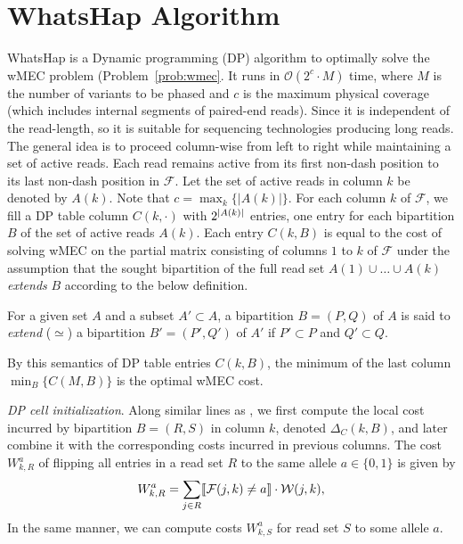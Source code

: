 \section{WhatsHap Algorithm}\label{sec:algorithm}
WhatsHap \citep{Patterson2015} is a Dynamic programming (DP) algorithm to optimally solve the wMEC problem (Problem~\ref{prob:wmec}.
It runs in $\mathcal{O}(2^c\cdot M)$ time, where $M$ is the number of variants to be phased and $c$ is the maximum physical coverage (which includes internal segments of paired-end reads).
Since it is independent of the read-length, so it is suitable for sequencing technologies producing long reads.
The general idea is to proceed column-wise from left to right while maintaining a set of active reads.
Each read remains active from its first non-dash position to its last non-dash position in $\mathcal{F}$.
Let the set of active reads in column $k$ be denoted by $A(k)$.
Note that $c=\max_{k}\{|A(k)|\}$.
For each column $k$ of $\mathcal{F}$, we fill a DP table column $C(k,\cdot)$ with $2^{\left\lvert A(k) \right\rvert}$ entries, one entry for each bipartition $B$ of the set of active reads $A(k)$.
Each entry $C(k,B)$ is equal to the cost of solving wMEC on the partial matrix consisting of columns $1$ to $k$ of $\mathcal{F}$ under the assumption that the sought bipartition of the full read set $A(1)\cup\ldots\cup A(k)$ \emph{extends} $B$ according to the below definition.
\begin{definition}
For a given set $A$ and a subset $A'\subset A$, a bipartition $B=(P,Q)$ of $A$ is said to \emph{extend} ($\simeq$) a bipartition $B'=(P',Q')$ of $A'$ if $P'\subset P$ and $Q'\subset Q$.
\label{def:bipartite-extend}
\end{definition}
By this semantics of DP table entries $C(k,B)$, the minimum of the last column $\min_B\{C(M,B)\}$ is the optimal wMEC cost.

\textit{DP cell initialization}. Along similar lines as \cite{Patterson2015}, we first compute the local cost incurred by bipartition $B= (R,S)$ in column $k$, 
denoted $\Delta_C(k,B)$, and later combine it with the corresponding costs incurred in previous columns.
The cost $W_{k,R}^a$ of flipping all entries in a read set $R$ to the same allele $a\in\{0,1\}$ is given by 
\[W_{k,R}^a = \sum_{j\in R}\llbracket \mathcal{F}(j,k)\neq a\rrbracket\cdot\mathcal{W}(j,k),\]
In the same manner, we can compute costs $W_{k,S}^a$ for read set $S$ to some allele $a$.

